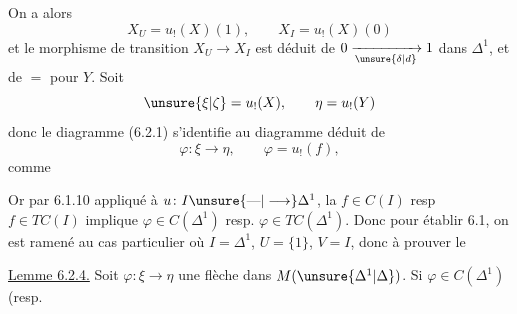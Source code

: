 On a alors
\[
 X_U=u_!(X)(1),\qquad X_I=u_!(X)(0)
\]
et le morphisme de transition
$X_U\longrightarrow X_I$ est déduit de  $0\xrightarrow[\unsure{\delta|d}]{}1$ dans
$\Delta^1$, et de $=$ pour $Y$. Soit
\[
 \unsure{\xi|\zeta}=u_!(X),\qquad \eta=u_!(Y)
\]
donc le diagramme (6.2.1) s'identifie
au diagramme déduit de
\[
 \varphi\colon \xi\longrightarrow\eta,\qquad \varphi=u_!(f),
\]
comme


Or par 6.1.10 appliqué à $u\colon I\unsure{\text{---}|\longrightarrow}\Delta^1$,
la  $f\in C(I)$ resp $f\in TC(I)$
implique $\varphi\in C(\Delta^1)$ resp. $\varphi\in TC(\Delta^1)$.
Donc pour établir 6.1, on est ramené
au cas particulier où $I=\Delta^1$, $U=\{1\}$, $V=I$,
donc à prouver le

\uline{Lemme 6.2.4.} Soit $\varphi\colon\xi\longrightarrow\eta$ une
flèche dans $M(\unsure{\Delta^1|\Delta})$. Si $\varphi\in C(\Delta^1)$ (resp.

